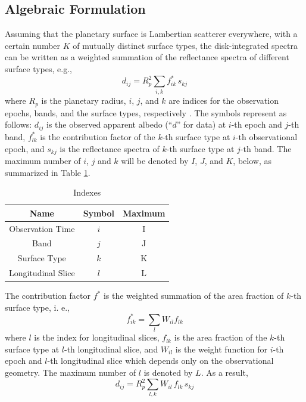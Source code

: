 \documentclass[iop,numberedappendix,apj,]{emulateapj}
\begin{document}
\subsection{Algebraic Formulation}
\label{ss:model}

Assuming that the planetary surface is Lambertian scatterer everywhere, with a certain number $K$ of mutually distinct surface types, 
the disk-integrated spectra can be written as a weighted summation of the reflectance spectra of different surface types, e.g., 
\begin{equation}
d_{ij} = R_p^2 \sum _{i,k} f_{ik}^{\ast } \, s_{kj}
\end{equation}
where $R_p$ is the planetary radius, $i$, $j$, and $k$ are indices for the observation epochs, bands, and the surface types, respectively \citep[see][]{Fujii2010} . 
The symbols represent as follows:
$d_{ij}$ is the observed apparent albedo (``$d$'' for data) at $i$-th epoch and $j$-th band, 
$f_{lk}^{\ast }$ is the contribution factor of the $k$-th surface type at $i$-th observational epoch, and 
$s_{kj}$ is the reflectance spectra of $k$-th surface type at $j$-th band. 
The maximum number of $i$, $j$ and $k$ will be denoted by $I$, $J$, and $K$, below, as summarized in Table \ref{tab:index}. 

\begin{table}[bh]
\caption{Indexes}
\begin{center}
\begin{tabular}{ccc} \hline \hline
Name & Symbol & Maximum \\ \hline
Observation Time & $i$ & I \\
Band & $j$ & J  \\
Surface Type & $k$ & K  \\
Longitudinal Slice  & $l$ & L \\ \hline
\end{tabular}
\end{center}
\label{tab:index}
\end{table}%


The contribution factor $f^{\ast }$ is the weighted summation of the area fraction of $k$-th surface type, i. e.,
\begin{equation}
f^{\ast }_{ik} = \sum _{l} W_{il} f_{lk}
\end{equation}
where $l$ is the index for longitudinal slices, $f_{lk}$ is the area fraction of the $k$-th surface type at $l$-th longitudinal slice, and 
$W_{il}$ is the weight function for $i$-th epoch and $l$-th longitudinal slice which depends only on the observational geometry. 
The maximum number of $l$ is denoted by $L$. 
As a result,
\begin{equation}
d_{ij} = R_p^2 \sum _{l,k} W_{il} \, f_{lk} \, s_{kj}
\end{equation}
\end{document}
